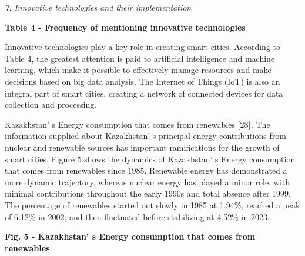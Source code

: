 {\emph{7. Innovative technologies and their implementation}

{\bfseries Table 4 - Frequency of mentioning innovative technologies}


Innovative technologies play a key role in creating smart cities.
According to Table 4, the greatest attention is paid to artificial
intelligence and machine learning, which make it possible to effectively
manage resources and make decisions based on big data analysis. The
Internet of Things (IoT) is also an integral part of smart cities,
creating a network of connected devices for data collection and
processing.

Kazakhstan' s Energy consumption that comes from
renewables {[}28{]}{\bfseries .} The information supplied about
Kazakhstan' s principal energy contributions from nuclear
and renewable sources has important ramifications for the growth of
smart cities. Figure 5 shows the dynamics of
Kazakhstan' s Energy consumption that comes from
renewables since 1985. Renewable energy has demonstrated a more dynamic
trajectory, whereas nuclear energy has played a minor role, with minimal
contributions throughout the early 1990s and total absence after 1999.
The percentage of renewables started out slowly in 1985 at 1.94\%,
reached a peak of 6.12\% in 2002, and then fluctuated before stabilizing
at 4.52\% in 2023.

{\bfseries Fig. 5 - Kazakhstan' s Energy consumption that
comes from renewables}

}
